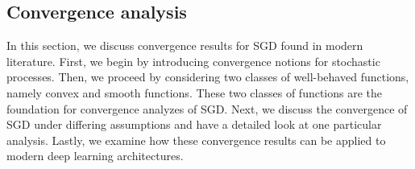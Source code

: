 \documentclass[12pt]{article}
\theoremstyle{definition}
\newtheorem{definition}[definition]{Definition}
\numberwithin{equation}{section}
\newcommand{\R}{\mathbb{R}}
\begin{document}
\subsection{Convergence analysis}
In this section, we discuss convergence results for SGD found in modern literature. First, we begin by introducing convergence notions for stochastic processes. Then, we proceed by considering two classes of well-behaved functions, namely convex and smooth functions. These two classes of functions are the foundation for convergence analyzes of SGD. Next, we discuss the convergence of SGD under differing assumptions and have a detailed look at one particular analysis. Lastly, we examine how these convergence results can be applied to modern deep learning architectures.
\end{document}
